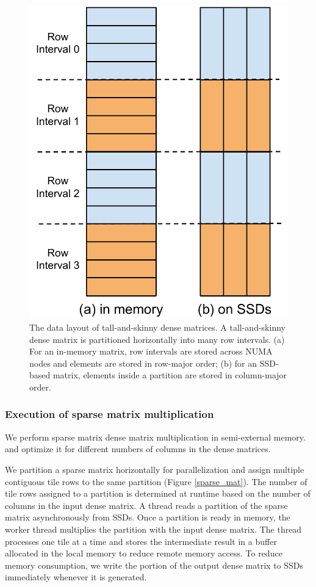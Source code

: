 \begin{figure}
\centering
\includegraphics[scale=0.4]{./dense_matrix.pdf}
\vspace{-5pt}
\caption{The data layout of tall-and-skinny dense matrices. A tall-and-skinny
dense matrix is partitioned horizontally into many row intervals.
(a) For an in-memory matrix, row intervals are stored across NUMA nodes and
elements are stored in row-major order; (b) for an SSD-based matrix, elements
inside a partition are stored in column-major order.}
\vspace{-5pt}
\label{dense_mat}
\end{figure}

\subsubsection{Execution of sparse matrix multiplication} \label{sec:exec}
We perform sparse matrix dense matrix multiplication in semi-external memory.
and optimize it for different numbers of columns in the dense matrices.

We partition a sparse matrix horizontally for parallelization and assign multiple
contiguous tile rows to the same partition (Figure \ref{sparse_mat}).
The number of tile rows assigned to a partition is determined at runtime
based on the number of columns in the input dense matrix. A thread reads
a partition of the sparse matrix asynchronously from SSDs. Once a partition
is ready in memory, the worker thread multiplies the partition with the input
dense matrix. The thread processes one tile at a time and stores
the intermediate result in a buffer allocated in the local memory to reduce
remote memory access. To reduce memory consumption,
we write the portion of the output dense matrix to SSDs immediately whenever
it is generated. 


